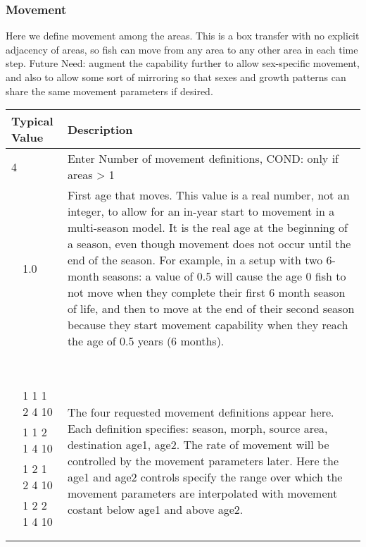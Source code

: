 \subsubsection{Movement}
Here we define movement among the areas.  This is a box transfer with no explicit adjacency of areas, so fish can move from any area to any other area in each time step.  
Future Need:  augment the capability further to allow sex-specific movement, and also to allow some sort of mirroring so that sexes and growth patterns can share the same movement parameters if desired.

\begin{longtable}{p{0.5cm} p{2cm} p{12cm}}
	\multicolumn{2}{l}{Typical Value} & Description \\
	\hline	
	\multicolumn{2}{l}{4} & \multicolumn{1}{l}{Enter Number of movement definitions, COND:  only if areas > 1}\\
		
		& 1.0 & \multirow{1}{12cm}{First age that moves. This value is a real number, not an integer, to allow for an in-year start to movement in a multi-season model.  It is the real age at the beginning of a season, even though movement does not occur until the end of the season.  For example, in a  setup with two 6-month seasons:  a value of 0.5 will cause the age 0 fish to not move when they complete their first 6 month season of life, and then to move at the end of their second season because they start movement capability when they reach the age of 0.5 years (6 months).} \\ \\ \\ \\ \\ \\ \\ \\ \\
		& 1 1 1 2 4 10 & \multicolumn{1}{l}{\multirow{5}{6cm}{\parbox{12cm}{The four requested movement definitions appear here.  Each definition specifies: season, morph, source area, destination age1, age2. The rate of movement will be controlled by the movement parameters later.  Here the age1 and age2 controls specify the range over which the movement parameters are interpolated with movement costant below age1 and above age2.}}}\\
		& 1 1 2 1 4 10 &  \\
		& 1 2 1 2 4 10 &  \\
		& 1 2 2 1 4 10 &  \\
		\\ \\
	\end{longtable}

